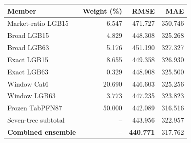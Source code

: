 \begin{tabular}{lrrr}
\toprule
Member & Weight (\%) & RMSE & MAE \\
\midrule
Market-ratio LGB15 & 6.547 & 471.727 & 350.746 \\
Broad LGB15 & 4.829 & 448.308 & 325.268 \\
Broad LGB63 & 5.176 & 451.190 & 327.327 \\
Exact LGB15 & 8.655 & 449.358 & 326.930 \\
Exact LGB63 & 0.329 & 448.908 & 325.500 \\
Window Cat6 & 20.690 & 446.603 & 325.256 \\
Window LGB63 & 3.773 & 447.235 & 323.823 \\
Frozen TabPFN87 & 50.000 & 442.089 & 316.516 \\
Seven-tree subtotal & -- & 443.956 & 322.957 \\
\textbf{Combined ensemble} & -- & \textbf{440.771} & 317.762 \\
\bottomrule
\end{tabular}
